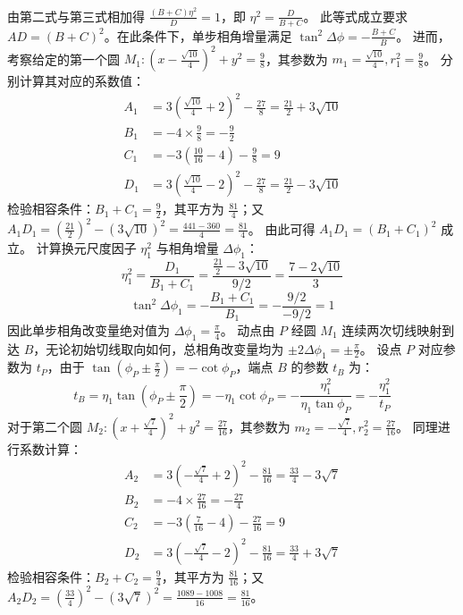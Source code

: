 \begin{solution}
由第二式与第三式相加得 $\frac{(B+C)\eta^2}{D} = 1$，即 $\eta^2 = \frac{D}{B+C}$。
此等式成立要求 $AD = (B+C)^2$。在此条件下，单步相角增量满足 $\tan^2\Delta\phi = -\frac{B+C}{B}$。
进而，考察给定的第一个圆 $M_1: \left(x - \frac{\sqrt{10}}{4}\right)^2 + y^2 = \frac{9}{8}$，其参数为 $m_1 = \frac{\sqrt{10}}{4}, r_1^2 = \frac{9}{8}$。
分别计算其对应的系数值：
\begin{align*}
A_1 &= 3\left(\frac{\sqrt{10}}{4} + 2\right)^2 - \frac{27}{8} = \frac{21}{2} + 3\sqrt{10} \\
B_1 &= -4 \times \frac{9}{8} = -\frac{9}{2} \\
C_1 &= -3\left(\frac{10}{16} - 4\right) - \frac{9}{8} = 9 \\
D_1 &= 3\left(\frac{\sqrt{10}}{4} - 2\right)^2 - \frac{27}{8} = \frac{21}{2} - 3\sqrt{10}
\end{align*}
检验相容条件：$B_1+C_1 = \frac{9}{2}$，其平方为 $\frac{81}{4}$；又 $A_1 D_1 = \left(\frac{21}{2}\right)^2 - (3\sqrt{10})^2 = \frac{441 - 360}{4} = \frac{81}{4}$。
由此可得 $A_1 D_1 = (B_1+C_1)^2$ 成立。
计算换元尺度因子 $\eta_1^2$ 与相角增量 $\Delta\phi_1$：
$$ \eta_1^2 = \frac{D_1}{B_1+C_1} = \frac{\frac{21}{2} - 3\sqrt{10}}{9/2} = \frac{7 - 2\sqrt{10}}{3} $$
$$ \tan^2\Delta\phi_1 = -\frac{B_1+C_1}{B_1} = -\frac{9/2}{-9/2} = 1 $$
因此单步相角改变量绝对值为 $\Delta\phi_1 = \frac{\pi}{4}$。
动点由 $P$ 经圆 $M_1$ 连续两次切线映射到达 $B$，无论初始切线取向如何，总相角改变量均为 $\pm 2\Delta\phi_1 = \pm\frac{\pi}{2}$。
设点 $P$ 对应参数为 $t_P$，由于 $\tan\left(\phi_P \pm \frac{\pi}{2}\right) = -\cot\phi_P$，端点 $B$ 的参数 $t_B$ 为：
$$ t_B = \eta_1\tan\left(\phi_P \pm \frac{\pi}{2}\right) = -\eta_1\cot\phi_P = -\frac{\eta_1^2}{\eta_1\tan\phi_P} = -\frac{\eta_1^2}{t_P} $$
对于第二个圆 $M_2: \left(x + \frac{\sqrt{7}}{4}\right)^2 + y^2 = \frac{27}{16}$，其参数为 $m_2 = -\frac{\sqrt{7}}{4}, r_2^2 = \frac{27}{16}$。
同理进行系数计算：
\begin{align*}
A_2 &= 3\left(-\frac{\sqrt{7}}{4} + 2\right)^2 - \frac{81}{16} = \frac{33}{4} - 3\sqrt{7} \\
B_2 &= -4 \times \frac{27}{16} = -\frac{27}{4} \\
C_2 &= -3\left(\frac{7}{16} - 4\right) - \frac{27}{16} = 9 \\
D_2 &= 3\left(-\frac{\sqrt{7}}{4} - 2\right)^2 - \frac{81}{16} = \frac{33}{4} + 3\sqrt{7}
\end{align*}
检验相容条件：$B_2+C_2 = \frac{9}{4}$，其平方为 $\frac{81}{16}$；又 $A_2 D_2 = \left(\frac{33}{4}\right)^2 - (3\sqrt{7})^2 = \frac{1089 - 1008}{16} = \frac{81}{16}$。

\end{solution}
